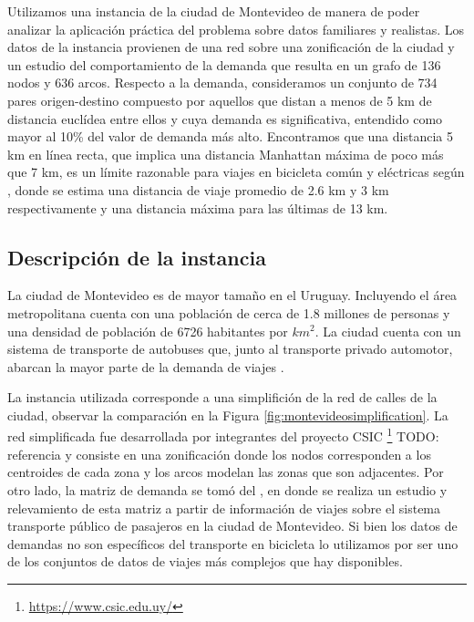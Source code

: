 Utilizamos una instancia de la ciudad de Montevideo de manera de poder analizar la aplicación práctica del problema sobre datos familiares y realistas. Los datos de la instancia provienen de una red sobre una zonificación de la ciudad y un estudio del comportamiento de la demanda que resulta en un grafo de 136 nodos y 636 arcos. Respecto a la demanda, consideramos un conjunto de 734 pares origen-destino compuesto por aquellos que distan a menos de 5 km de distancia euclídea entre ellos y cuya demanda es significativa, entendido como mayor al 10\% del valor de demanda más alto. Encontramos que una distancia 5 km en línea recta, que implica una distancia Manhattan máxima de poco más que 7 km, es un límite razonable para viajes en bicicleta común y eléctricas según \cite{anette2018}, donde se estima una distancia de viaje promedio de 2.6 km y 3 km respectivamente y una distancia máxima para las últimas de 13 km.

\subsection{Descripción de la instancia}

La ciudad de Montevideo es de mayor tamaño en el Uruguay. Incluyendo el área metropolitana cuenta con una población de cerca de 1.8 millones de personas y una densidad de población de 6726 habitantes por $km^2$. La ciudad cuenta con un sistema de transporte de autobuses que, junto al transporte privado automotor, abarcan la mayor parte de la demanda de viajes \cite{Mauttone2017a}.

La instancia utilizada corresponde a una simplifición de la red de calles de la ciudad, observar la comparación en la Figura \ref{fig:montevideosimplification}. La red simplificada fue desarrollada por integrantes del proyecto CSIC \footnote{\url{https://www.csic.edu.uy/}} TODO: referencia y consiste en una zonificación donde los nodos corresponden a los centroides de cada zona y los arcos modelan las zonas que son adjacentes. Por otro lado, la matriz de demanda se tomó del \cite{Massobrio2020}, en donde se realiza un estudio y relevamiento de esta matriz a partir de información de viajes sobre el sistema transporte público de pasajeros en la ciudad de Montevideo. Si bien los datos de demandas no son específicos del transporte en bicicleta lo utilizamos por ser uno de los conjuntos de datos de viajes más complejos que hay disponibles.

